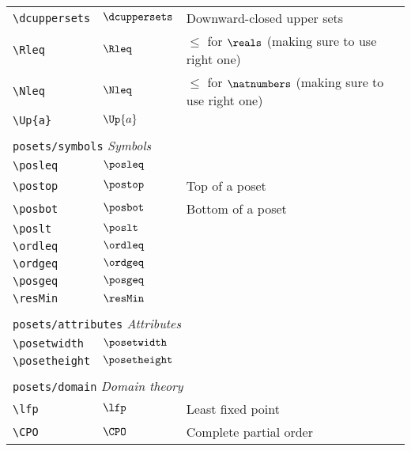 \begin{longtable}{lll}
 {\color[rgb]{0.5,0.5,0.5}\texttt{\textbackslash dcuppersets}} & $\dcuppersets$ &  Downward-closed upper sets\\ 
 {\color[rgb]{0.5,0.5,0.5}\texttt{\textbackslash Rleq}} & $\Rleq$ &  $\leq$ for $\reals$ (making sure to use right one)\\ 
 {\color[rgb]{0.5,0.5,0.5}\texttt{\textbackslash Nleq}} & $\Nleq$ &  $\leq$ for $\natnumbers$ (making sure to use right one)\\ 
 {\color[rgb]{0.5,0.5,0.5}\texttt{\textbackslash Up\{a\}}} & $\Up{a}$ & \\ 
  &  & \\ 
 \multicolumn{3}{l}{{\color[rgb]{0.5,0.5,0.5}\texttt{posets/symbols}} \emph{Symbols}}\\ 
 \hline
{\color[rgb]{0.5,0.5,0.5}\texttt{\textbackslash posleq}} & $\posleq$ & \\ 
 {\color[rgb]{0.5,0.5,0.5}\texttt{\textbackslash postop}} & $\postop$ &  Top of a poset\\ 
 {\color[rgb]{0.5,0.5,0.5}\texttt{\textbackslash posbot}} & $\posbot$ &  Bottom of a poset\\ 
 {\color[rgb]{0.5,0.5,0.5}\texttt{\textbackslash poslt}} & $\poslt$ & \\ 
 {\color[rgb]{0.5,0.5,0.5}\texttt{\textbackslash ordleq}} & $\ordleq$ & \\ 
 {\color[rgb]{0.5,0.5,0.5}\texttt{\textbackslash ordgeq}} & $\ordgeq$ & \\ 
 {\color[rgb]{0.5,0.5,0.5}\texttt{\textbackslash posgeq}} & $\posgeq$ & \\ 
 {\color[rgb]{0.5,0.5,0.5}\texttt{\textbackslash resMin}} & $\resMin$ & \\ 
  &  & \\ 
 \multicolumn{3}{l}{{\color[rgb]{0.5,0.5,0.5}\texttt{posets/attributes}} \emph{Attributes}}\\ 
 \hline
{\color[rgb]{0.5,0.5,0.5}\texttt{\textbackslash posetwidth}} & $\posetwidth$ & \\ 
 {\color[rgb]{0.5,0.5,0.5}\texttt{\textbackslash posetheight}} & $\posetheight$ & \\ 
  &  & \\ 
 \multicolumn{3}{l}{{\color[rgb]{0.5,0.5,0.5}\texttt{posets/domain}} \emph{Domain theory}}\\ 
 \hline
{\color[rgb]{0.5,0.5,0.5}\texttt{\textbackslash lfp}} & $\lfp$ &  Least fixed point\\ 
 {\color[rgb]{0.5,0.5,0.5}\texttt{\textbackslash CPO}} & $\CPO$ &  Complete partial order\\ 

\end{longtable}
